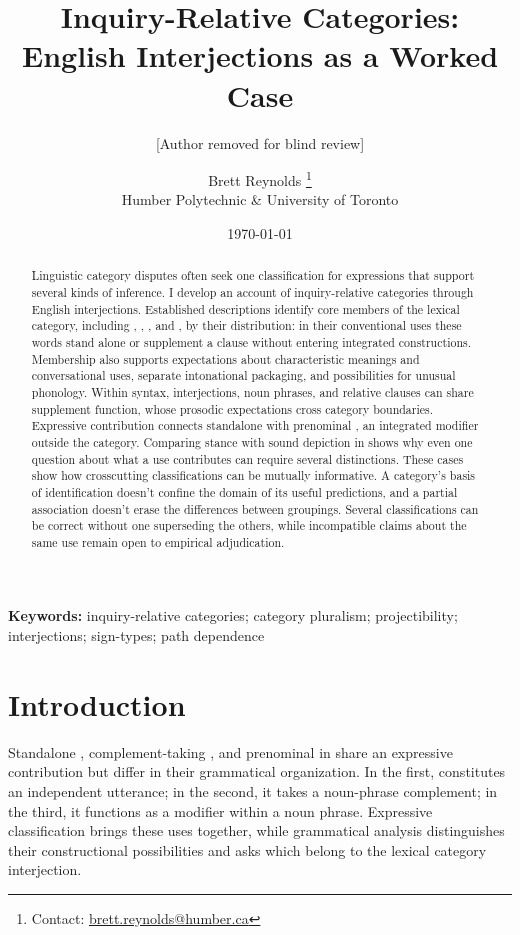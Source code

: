 \documentclass[12pt]{article}
\title{Inquiry-Relative Categories:\\English Interjections as a Worked Case}
\author{[Author removed for blind review]}
\author{Brett Reynolds \orcidlink{0000-0003-0073-7195}%
\thanks{Contact: \href{mailto:brett.reynolds@humber.ca}{brett.reynolds@humber.ca}}\\
Humber Polytechnic \& University of Toronto}
\date{\today}
\begin{document}
\maketitle

\begin{abstract}
Linguistic category disputes often seek one classification for expressions
that support several kinds of inference. I develop an account of
inquiry-relative categories through English interjections. Established
descriptions identify core members of the lexical category, including
, , , and , by
their distribution: in their conventional uses these words stand alone or
supplement a clause without entering integrated constructions. Membership
also supports expectations about characteristic meanings and conversational uses,
separate intonational packaging, and possibilities for unusual phonology.
Within syntax, interjections, noun phrases, and relative clauses can share
supplement function, whose prosodic expectations cross category
boundaries. Expressive contribution connects standalone 
with prenominal , an integrated modifier outside the category. Comparing
stance with sound depiction in  shows why even one question
about what a use contributes can require several distinctions.
These cases show how crosscutting classifications can be mutually
informative. A category's basis of identification doesn't confine the
domain of its useful predictions, and a partial association doesn't
erase the differences between groupings. Several classifications can
be correct without one superseding the others, while incompatible
claims about the same use remain open to empirical adjudication.
\end{abstract}

\noindent\textbf{Keywords:} inquiry-relative categories; category pluralism;
projectibility; interjections; sign-types; path dependence


\section{Introduction}\label{sec:intro}

Standalone , complement-taking ,
and prenominal  in  share an expressive
contribution but differ in their grammatical organization. In the first,
 constitutes an independent utterance; in the second, it
takes a noun-phrase complement; in the third, it functions as a modifier
within a noun phrase. Expressive classification brings these uses together,
while grammatical analysis distinguishes their constructional possibilities
and asks which belong to the lexical category interjection.
\end{document}
